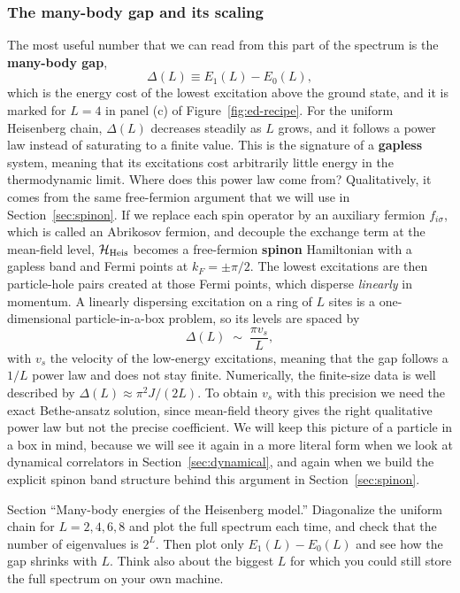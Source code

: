 \documentclass[lecture_notes.tex]{subfiles}
\begin{document}
\subsubsection{The many-body gap and its scaling}
The most useful number that we can read from this part of the spectrum is the \textbf{many-body
gap},
\begin{equation}
  \Delta(L) \equiv E_1(L) - E_0(L),
  \label{eq:manybodygap}
\end{equation}
which is the energy cost of the lowest excitation above the ground state, and it is marked for $L=4$
in panel (c) of Figure~\ref{fig:ed-recipe}. For the uniform Heisenberg chain, $\Delta(L)$ decreases
steadily as $L$ grows, and it follows a power law instead of saturating to a finite value. This is
the signature of a \textbf{gapless} system, meaning that its excitations cost arbitrarily little
energy in the thermodynamic limit. Where does this power law come from? Qualitatively, it comes from
the same free-fermion argument that we will use in Section~\ref{sec:spinon}. If we replace each spin
operator by an auxiliary fermion $f_{i\sigma}$, which is called an Abrikosov fermion, and decouple
the exchange term at the mean-field level, $\mathcal{H}_{\mathrm{Heis}}$ becomes a free-fermion
\textbf{spinon} Hamiltonian with a gapless band and Fermi points at $k_F=\pm\pi/2$. The lowest
excitations are then particle-hole pairs created at those Fermi points, which disperse
\emph{linearly} in momentum. A linearly dispersing excitation on a ring of $L$ sites is a
one-dimensional particle-in-a-box problem, so its levels are spaced by
\begin{equation}
  \Delta(L) \;\sim\; \frac{\pi v_s}{L},
  \label{eq:gapscaling}
\end{equation}
with $v_s$ the velocity of the low-energy excitations, meaning that the gap follows a $1/L$ power law
and does not stay finite. Numerically, the finite-size data is well described by
$\Delta(L)\approx\pi^2J/(2L)$. To obtain $v_s$ with this precision we need the exact Bethe-ansatz
solution, since mean-field theory gives the right qualitative power law but not the precise
coefficient. We will keep this picture of a particle in a box in mind, because we will see it again
in a more literal form when we look at dynamical correlators in Section~\ref{sec:dynamical}, and
again when we build the explicit spinon band structure behind this argument in
Section~\ref{sec:spinon}.

\begin{notebook}
Section ``Many-body energies of the Heisenberg model.'' Diagonalize the uniform chain for
$L=2,4,6,8$ and plot the full spectrum each time, and check that the number of eigenvalues is
$2^L$. Then plot only $E_1(L)-E_0(L)$ and see how the gap shrinks with $L$. Think also about the
biggest $L$ for which you could still store the full spectrum on your own machine.
\end{notebook}
\end{document}
